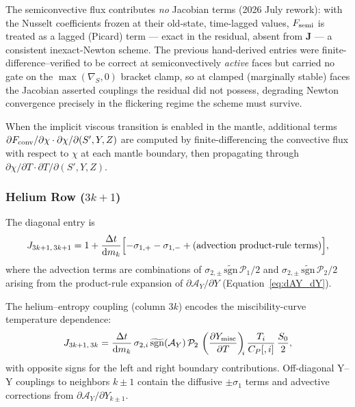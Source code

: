 \documentclass{aastex631}
\newcommand{\dd}{\mathrm{d}}
\newcommand{\pp}{\partial}
\newcommand{\Cp}{C_P}
\newcommand{\Yeq}{Y_{\rm misc}}
\begin{document}
The semiconvective flux contributes \emph{no} Jacobian terms (2026
July rework): with the Nusselt coefficients frozen at their
old-state, time-lagged values, $F_{\rm semi}$ is treated as a
lagged (Picard) term --- exact in the residual, absent from
$\mathbf{J}$ --- a consistent inexact-Newton scheme.
The previous hand-derived entries were finite-difference--verified
to be correct at semiconvectively \emph{active} faces but carried
no gate on the $\max(\nabla_{\!S},0)$ bracket clamp, so at clamped
(marginally stable) faces the Jacobian asserted couplings the
residual did not possess, degrading Newton convergence precisely in
the flickering regime the scheme must survive.

When the implicit viscous transition is enabled in the mantle,
additional terms
$\pp F_{\rm conv}/\pp\chi\cdot\pp\chi/\pp(S',Y,Z)$ are computed
by finite-differencing the convective flux with respect to $\chi$ at
each mantle boundary, then propagating through
$\pp\chi/\pp T\cdot\pp T/\pp(S',Y,Z)$.

\subsubsection{Helium Row ($3k+1$)}\label{sec:jac_helium}

The diagonal entry is
\begin{equation}\label{eq:J_YY_diag}
  J_{3k+1,\,3k+1}
  = 1
  + \frac{\Delta t}{\dd m_k}\Bigl[
      -\sigma_{1,+} - \sigma_{1,-}
      + \text{(advection product-rule terms)}
    \Bigr],
\end{equation}
where the advection terms are combinations of
$\sigma_{2,\pm}\,\widetilde{\mathrm{sgn}}\,\mathcal{P}_1/2$
and $\sigma_{2,\pm}\,\widetilde{\mathrm{sgn}}\,\mathcal{P}_2/2$
arising from the product-rule expansion of
$\pp\mathcal{A}_Y/\pp Y$ (Equation~\ref{eq:dAY_dY}).

The helium--entropy coupling (column $3k$) encodes the
miscibility-curve temperature dependence:
\begin{equation}\label{eq:J_YS}
  J_{3k+1,\,3k}
  = \frac{\Delta t}{\dd m_k}\,\sigma_{2,i}\,
    \widetilde{\mathrm{sgn}}(\mathcal{A}_Y)\,\mathcal{P}_2\,
    \left(\frac{\pp\Yeq}{\pp T}\right)_{\!\!i}
    \frac{T_i}{\Cp[,i]}\,\frac{S_0}{2},
\end{equation}
with opposite signs for the left and right boundary contributions.
Off-diagonal Y--Y couplings to neighbors $k\pm1$ contain the
diffusive $\pm\sigma_1$ terms and advective corrections from
$\pp\mathcal{A}_Y/\pp Y_{k\pm1}$.
\end{document}
